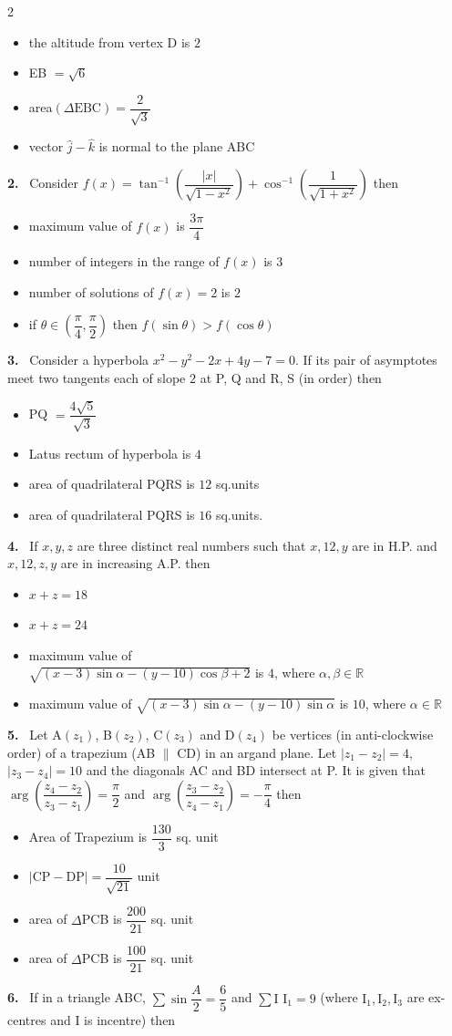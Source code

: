 \documentclass[10pt]{extarticle}
\newcommand{\qn}[1]{\par\smallskip\noindent\textbf{#1.}~}
\newenvironment{qoptions}{\begin{itemize}[leftmargin=1.8em,itemsep=1pt,topsep=2pt,label={}]}{\end{itemize}}
\newcommand{\opt}[2]{\item[(#1)] #2}
\begin{document}
\begin{multicols}{2}
\begin{qoptions}
\opt{A}{the altitude from vertex D is $2$}
\opt{B}{EB $=\sqrt6$}
\opt{C}{area$(\Delta\text{EBC})=\dfrac{2}{\sqrt3}$}
\opt{D}{vector $\hat j-\hat k$ is normal to the plane ABC}
\end{qoptions}
\qn{2} Consider $f(x)=\tan^{-1}\left(\dfrac{|x|}{\sqrt{1-x^2}}\right)+\cos^{-1}\left(\dfrac{1}{\sqrt{1+x^2}}\right)$ then
\begin{qoptions}
\opt{A}{maximum value of $f(x)$ is $\dfrac{3\pi}{4}$}
\opt{B}{number of integers in the range of $f(x)$ is $3$}
\opt{C}{number of solutions of $f(x)=2$ is $2$}
\opt{D}{if $\theta\in\left(\dfrac\pi4,\dfrac\pi2\right)$ then $f(\sin\theta)>f(\cos\theta)$}
\end{qoptions}
\qn{3} Consider a hyperbola $x^2-y^2-2x+4y-7=0$. If its pair of asymptotes meet two tangents each of slope $2$ at P, Q and R, S (in order) then
\begin{qoptions}
\opt{A}{PQ $=\dfrac{4\sqrt5}{\sqrt3}$}
\opt{B}{Latus rectum of hyperbola is $4$}
\opt{C}{area of quadrilateral PQRS is $12$ sq.units}
\opt{D}{area of quadrilateral PQRS is $16$ sq.units.}
\end{qoptions}
\qn{4} If $x,y,z$ are three distinct real numbers such that $x,12,y$ are in H.P. and $x,12,z,y$ are in increasing A.P. then
\begin{qoptions}
\opt{A}{$x+z=18$}
\opt{B}{$x+z=24$}
\opt{C}{maximum value of\\ $\sqrt{(x-3)\sin\alpha-(y-10)\cos\beta+2}$ is $4$, where $\alpha,\beta\in\mathbb R$}
\opt{D}{maximum value of $\sqrt{(x-3)\sin\alpha-(y-10)\sin\alpha}$ is $10$, where $\alpha\in\mathbb R$}
\end{qoptions}
\qn{5} Let A$(z_1)$, B$(z_2)$, C$(z_3)$ and D$(z_4)$ be vertices (in anti-clockwise order) of a trapezium (AB $\parallel$ CD) in an argand plane. Let $|z_1-z_2|=4$, $|z_3-z_4|=10$ and the diagonals AC and BD intersect at P. It is given that $\arg\left(\dfrac{z_4-z_2}{z_3-z_1}\right)=\dfrac\pi2$ and $\arg\left(\dfrac{z_3-z_2}{z_4-z_1}\right)=-\dfrac\pi4$ then
\begin{qoptions}
\opt{A}{Area of Trapezium is $\dfrac{130}{3}$ sq. unit}
\opt{B}{$|\text{CP}-\text{DP}|=\dfrac{10}{\sqrt{21}}$ unit}
\opt{C}{area of $\Delta$PCB is $\dfrac{200}{21}$ sq. unit}
\opt{D}{area of $\Delta$PCB is $\dfrac{100}{21}$ sq. unit}
\end{qoptions}
\qn{6} If in a triangle ABC, $\sum\sin\dfrac A2=\dfrac65$ and $\sum\text{I I}_1=9$ (where $\text{I}_1,\text{I}_2,\text{I}_3$ are ex-centres and I is incentre) then

\end{multicols}
\end{document}

